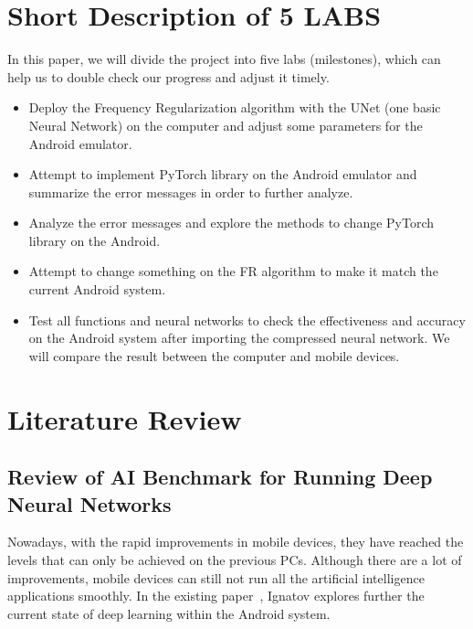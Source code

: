 \documentclass{article}
\begin{document}
\section{Short Description of 5 LABS}

In this paper, we will divide the project into five labs (milestones), which can help us to double check our progress and adjust it timely.

\begin{itemize}
	\item Deploy the Frequency Regularization algorithm with the UNet (one basic Neural Network) on the computer and adjust some parameters for the Android emulator. 
	
	\item Attempt to implement PyTorch library on the Android emulator and summarize the error messages in order to further analyze.
	
	\item Analyze the error messages and explore the methods to change PyTorch library on the Android.
	
	\item Attempt to change something on the FR algorithm to make it match the current Android system. 
	
	\item Test all functions and neural networks to check the effectiveness and accuracy on the Android system after importing the compressed neural network. We will compare the result between the computer and mobile devices. 
	
\end{itemize}


\section{Literature Review}

\subsection{Review of AI Benchmark for Running Deep Neural Networks}
Nowadays, with the rapid improvements in mobile devices, they have reached the levels that can only be achieved on the previous PCs. Although there are a lot of improvements, mobile devices can still not run all the artificial intelligence applications smoothly. In the existing paper~\cite{Andrey2019Aibenchmark}, Ignatov explores further the current state of deep learning within the Android system.
\end{document}
